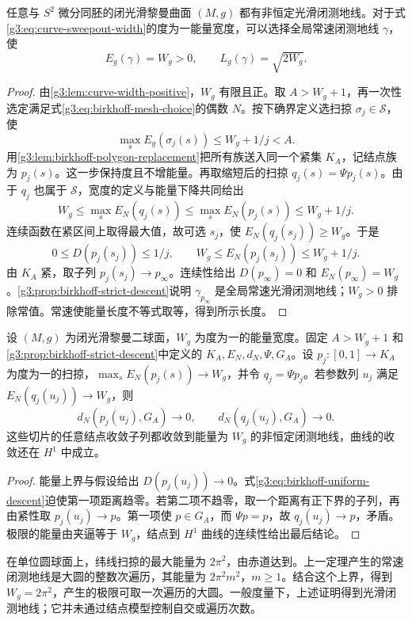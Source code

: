 \begin{theorem}\label{g3:thm:birkhoff-sphere-geodesic}
	任意与 \(S^2\) 微分同胚的闭光滑黎曼曲面 \((M,g)\) 都有非恒定光滑闭测地线。对于式\eqref{g3:eq:curve-sweepout-width}的度为一能量宽度，可以选择全局常速闭测地线 \(\gamma\)，使
	\[
		E_g(\gamma)=W_g>0,\qquad L_g(\gamma)=\sqrt{2W_g}.
	\]
\end{theorem}
\begin{proof}
	由\cref{g3:lem:curve-width-positive}，\(W_g\) 有限且正。取 \(A>W_g+1\)，再一次性选定满足式\eqref{g3:eq:birkhoff-mesh-choice}的偶数 \(N\)。按下确界定义选扫掠 \(\sigma_j\in\mathscr S\)，使
	\[
		\max_s E_g(\sigma_j(s))\le W_g+1/j<A.
	\]
	用\cref{g3:lem:birkhoff-polygon-replacement}把所有族送入同一个紧集 \(K_A\)，记结点族为 \(p_j(s)\)。这一步保持度且不增能量。再取缩短后的扫掠 \(q_j(s)=\Psi p_j(s)\)。由于 \(q_j\) 也属于 \(\mathscr S\)，宽度的定义与能量下降共同给出
	\[
		W_g\le\max_s E_N(q_j(s))\le\max_s E_N(p_j(s))\le W_g+1/j.
	\]
	连续函数在紧区间上取得最大值，故可选 \(s_j\)，使 \(E_N(q_j(s_j))\ge W_g\)。于是
	\[
		0\le D(p_j(s_j))\le1/j,\qquad
		W_g\le E_N(p_j(s_j))\le W_g+1/j.
	\]
	由 \(K_A\) 紧，取子列 \(p_j(s_j)\to p_\infty\)。连续性给出 \(D(p_\infty)=0\) 和 \(E_N(p_\infty)=W_g\)。\cref{g3:prop:birkhoff-strict-descent}说明 \(\gamma_{p_\infty}\) 是全局常速光滑闭测地线；\(W_g>0\) 排除常值。常速使能量长度不等式取等，得到所示长度。
\end{proof}

\begin{corollary}\label{g3:cor:birkhoff-almost-maximal}
	设 \((M,g)\) 为闭光滑黎曼二球面，\(W_g\) 为度为一的能量宽度。固定 \(A>W_g+1\) 和\cref{g3:prop:birkhoff-strict-descent}中定义的 \(K_A,E_N,d_N,\Psi,G_A\)。设 \(p_j:[0,1]\to K_A\) 为度为一的扫掠，\(\max_sE_N(p_j(s))\to W_g\)，并令 \(q_j=\Psi p_j\)。若参数列 \(u_j\) 满足 \(E_N(q_j(u_j))\to W_g\)，则
	\[
		d_N(p_j(u_j),G_A)\to0,
		\qquad d_N(q_j(u_j),G_A)\to0.
	\]
	这些切片的任意结点收敛子列都收敛到能量为 \(W_g\) 的非恒定闭测地线，曲线的收敛还在 \(H^1\) 中成立。
\end{corollary}
\begin{proof}
	能量上界与假设给出 \(D(p_j(u_j))\to0\)。式\eqref{g3:eq:birkhoff-uniform-descent}迫使第一项距离趋零。若第二项不趋零，取一个距离有正下界的子列，再由紧性取 \(p_j(u_j)\to p\)。第一项使 \(p\in G_A\)，而 \(\Psi p=p\)，故 \(q_j(u_j)\to p\)，矛盾。极限的能量由夹逼等于 \(W_g\)，结点到 \(H^1\) 曲线的连续性给出最后结论。
\end{proof}
在单位圆球面上，纬线扫掠的最大能量为 \(2\pi^2\)，由赤道达到。上一定理产生的常速闭测地线是大圆的整数次遍历，其能量为 \(2\pi^2m^2\)，\(m\ge1\)。结合这个上界，得到 \(W_g=2\pi^2\)，产生的极限可取一次遍历的大圆。一般度量下，上述证明得到光滑闭测地线；它并未通过结点模型控制自交或遍历次数。


